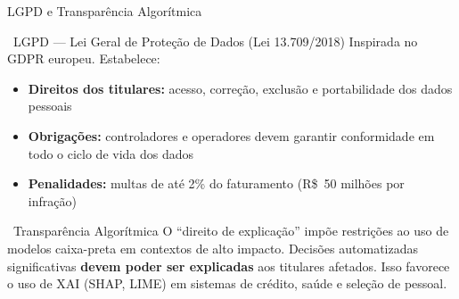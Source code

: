 \documentclass[aspectratio=169]{beamer}
\begin{document}
\begin{frame}{LGPD e Transparência Algorítmica}
    
    \begin{block}{\faGavel\ LGPD --- Lei Geral de Proteção de Dados (Lei 13.709/2018)}
        Inspirada no GDPR europeu. Estabelece:
        \begin{itemize}
            \item \textbf{Direitos dos titulares:} acesso, correção, exclusão e portabilidade dos dados pessoais
            \item \textbf{Obrigações:} controladores e operadores devem garantir conformidade em todo o ciclo de vida dos dados
            \item \textbf{Penalidades:} multas de até 2\% do faturamento (R\$~50 milhões por infração)
        \end{itemize}
    \end{block}
    \vspace{-0.4cm}
    \begin{block}{\faEye\ Transparência Algorítmica}
        O ``direito de explicação'' impõe restrições ao uso de modelos caixa-preta em contextos de alto impacto.
        Decisões automatizadas significativas \textbf{devem poder ser explicadas} aos titulares afetados.
        Isso favorece o uso de XAI (SHAP, LIME) em sistemas de crédito, saúde e seleção de pessoal.
    \end{block}
\end{frame}
\end{document}
